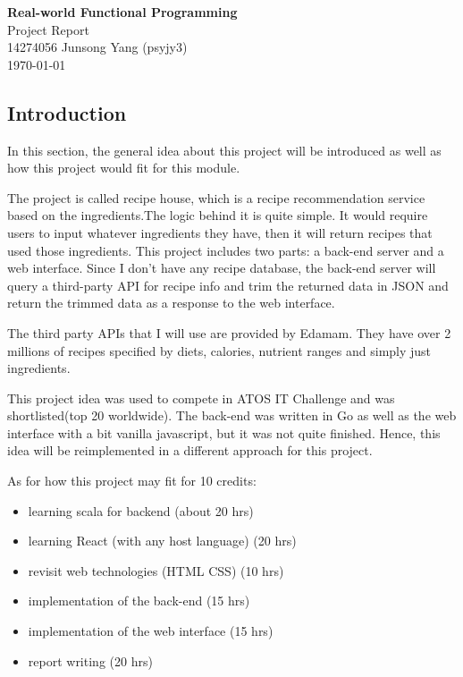 \documentclass{article}
\begin{document}
\begin{center}
  \LARGE{\textbf{Real-world Functional Programming}} \\
  \Large{Project Report} \\
  \normalsize{14274056 Junsong Yang (psyjy3)} \\
  \today
\end{center}


\begin{normalsize}
  \section{Introduction}
  In this section, the general idea about this project will be introduced as
  well as how this project would fit for this module.

  The project is called recipe house, which is a recipe recommendation service
  based on the ingredients.The logic behind it is quite simple. It would require
  users to input whatever ingredients they have, then it will return recipes
  that used those ingredients. This project includes two parts: a back-end
  server and a web interface. Since I don't have any recipe database, the
  back-end server will query a third-party API for recipe info and trim the
  returned data in JSON and return the trimmed data as a response to the web
  interface.

  The third party APIs that I will use are provided by Edamam. They have over 2
  millions of recipes specified by diets, calories, nutrient ranges and simply
  just ingredients.

  This project idea was used to compete in ATOS IT Challenge and was
  shortlisted(top 20 worldwide). The back-end was written in Go as well as the
  web interface with a bit vanilla javascript, but it was not quite finished.
  Hence, this idea will be reimplemented in a different approach for this
  project.

  As for how this project may fit for 10 credits:
  \begin{itemize}
  \item[]{learning scala for backend (about 20 hrs)}
  \item[]{learning React (with any host language) (20 hrs)}
  \item[]{revisit web technologies (HTML CSS) (10 hrs)}
  \item[]{implementation of the back-end (15 hrs)}
  \item[]{implementation of the web interface (15 hrs)}
  \item[]{report writing (20 hrs)}  
  \end{itemize}


\end{normalsize}
\end{document}
